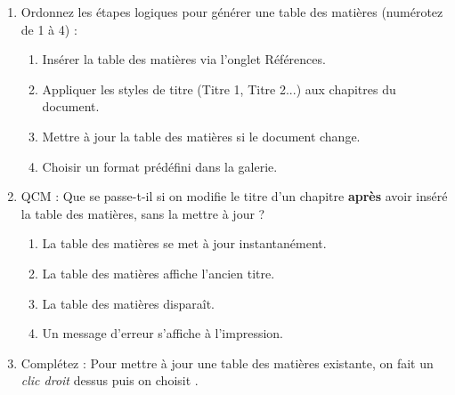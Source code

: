 \documentclass[11pt]{article}
\begin{document}
\begin{exercice}
\begin{enumerate}
    \item Ordonnez les étapes logiques pour générer une table des matières (numérotez de 1 à 4) :
    \begin{enumerate}
        \item Insérer la table des matières via l'onglet Références.
        \item Appliquer les styles de titre (Titre 1, Titre 2...) aux chapitres du document.
        \item Mettre à jour la table des matières si le document change.
        \item Choisir un format prédéfini dans la galerie.
    \end{enumerate}
    \item QCM : Que se passe-t-il si on modifie le titre d'un chapitre \textbf{après} avoir inséré la table des matières, sans la mettre à jour ?
    \begin{enumerate}
        \item La table des matières se met à jour instantanément.
        \item La table des matières affiche l'ancien titre.
        \item La table des matières disparaît.
        \item Un message d'erreur s'affiche à l'impression.
    \end{enumerate}
    \item Complétez : Pour mettre à jour une table des matières existante, on fait un \textit{clic droit} dessus puis on choisit \underline{\hspace{5cm}}.
\end{enumerate}
\end{exercice}
\end{document}
